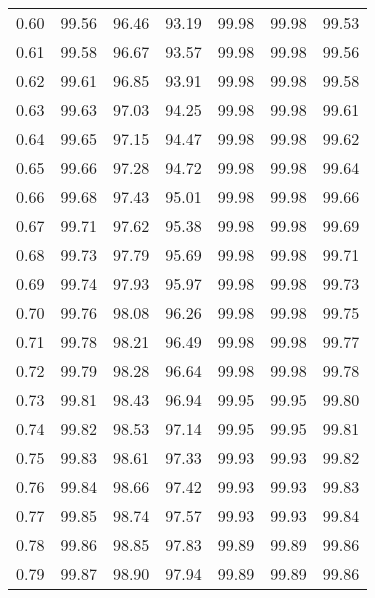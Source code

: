 \begin{tabular}{|c|c|c|c|c|c|c|}
      0.60 &     99.56 &     96.46 &      93.19 &   99.98 &      99.98 &         99.53 \\
      0.61 &     99.58 &     96.67 &      93.57 &   99.98 &      99.98 &         99.56 \\
      0.62 &     99.61 &     96.85 &      93.91 &   99.98 &      99.98 &         99.58 \\
      0.63 &     99.63 &     97.03 &      94.25 &   99.98 &      99.98 &         99.61 \\
      0.64 &     99.65 &     97.15 &      94.47 &   99.98 &      99.98 &         99.62 \\
      0.65 &     99.66 &     97.28 &      94.72 &   99.98 &      99.98 &         99.64 \\
      0.66 &     99.68 &     97.43 &      95.01 &   99.98 &      99.98 &         99.66 \\
      0.67 &     99.71 &     97.62 &      95.38 &   99.98 &      99.98 &         99.69 \\
      0.68 &     99.73 &     97.79 &      95.69 &   99.98 &      99.98 &         99.71 \\
      0.69 &     99.74 &     97.93 &      95.97 &   99.98 &      99.98 &         99.73 \\
      0.70 &     99.76 &     98.08 &      96.26 &   99.98 &      99.98 &         99.75 \\
      0.71 &     99.78 &     98.21 &      96.49 &   99.98 &      99.98 &         99.77 \\
      0.72 &     99.79 &     98.28 &      96.64 &   99.98 &      99.98 &         99.78 \\
      0.73 &     99.81 &     98.43 &      96.94 &   99.95 &      99.95 &         99.80 \\
      0.74 &     99.82 &     98.53 &      97.14 &   99.95 &      99.95 &         99.81 \\
      0.75 &     99.83 &     98.61 &      97.33 &   99.93 &      99.93 &         99.82 \\
      0.76 &     99.84 &     98.66 &      97.42 &   99.93 &      99.93 &         99.83 \\
      0.77 &     99.85 &     98.74 &      97.57 &   99.93 &      99.93 &         99.84 \\
      0.78 &     99.86 &     98.85 &      97.83 &   99.89 &      99.89 &         99.86 \\
      0.79 &     99.87 &     98.90 &      97.94 &   99.89 &      99.89 &         99.86 \\

\end{tabular}
